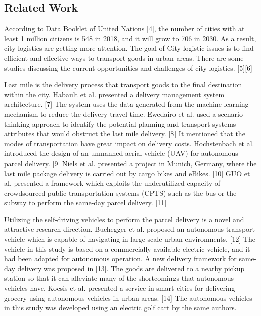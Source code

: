 \documentclass[12pt]{ksthesis}
\begin{document}
\begin{thesis}
{  


\chapter{Related Work} \label{Chap:Related}

According to Data Booklet of United Nations [4], the number of cities with at least 1 million citizens is 548 in 2018, and it will grow to 706 in 2030. As a result, city logistics are getting more attention. The goal of City logistic issues is to find efficient and effective ways to transport goods in urban areas. There are some studies discussing the current opportunities and challenges of city logistics. [5][6]
 
Last mile is the delivery process that transport goods to the final destination within the city. Habault et al. presented a delivery management system architecture. [7] The system uses the data generated from the machine-learning mechanism to reduce the delivery travel time. Ewedairo et al. used a scenario thinking approach to identify the potential planning and transport systems attributes that would obstruct the last mile delivery. [8] It mentioned that the modes of transportation have great impact on delivery costs. Hochstenbach et al. introduced the design of an unmanned aerial vehicle (UAV) for autonomous parcel delivery. [9] Niels et al. presented a project in Munich, Germany, where the last mile package delivery is carried out by cargo bikes and eBikes. [10] GUO et al. presented a framework which exploits the underutilized capacity of crowdsourced public transportation systems (CPTS) such as the bus or the subway to perform the same-day parcel delivery. [11]

Utilizing the self-driving vehicles to perform the parcel delivery is a novel and attractive research direction. Buchegger et al. proposed an autonomous transport vehicle which is capable of navigating in large-scale urban environments. [12] The vehicle in this study is based on a commercially available electric vehicle, and it had been adapted for autonomous operation. A new delivery framework for same-day delivery was proposed in [13]. The goods are delivered to a nearby pickup station so that it can alleviate many of the shortcomings that autonomous vehicles have. Kocsis et al. presented a service in smart cities for delivering grocery using autonomous vehicles in urban areas. [14] The autonomous vehicles in this study was developed using an electric golf cart by the same authors.


}
\end{thesis}
\end{document}
